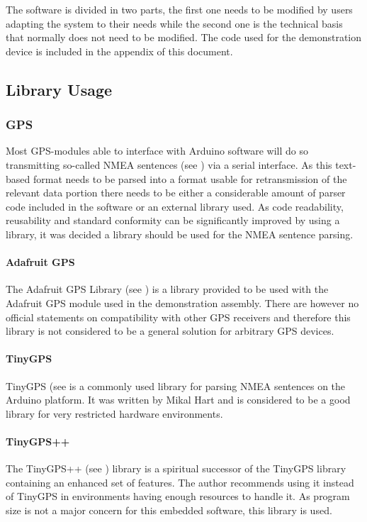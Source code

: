 The software is divided in two parts, the first one needs to be modified by users adapting the system to their needs while the second one is the technical basis that normally does not need to be modified. The code used for the demonstration device is included in the appendix of this document.

\subsection{Library Usage}
\subsubsection{GPS}
Most GPS-modules able to interface with Arduino software will do so transmitting so-called NMEA sentences (see \cite{NMEASentences}) via a serial interface. As this text-based format needs to be parsed into a format usable for retransmission of the relevant data portion there needs to be either a considerable amount of parser code included in the software or an external library used. As code readability, reusability and standard conformity can be significantly improved by using a library, it was decided a library should be used for the NMEA sentence parsing.

\paragraph{Adafruit GPS}
The Adafruit GPS Library (see \cite{AdaUltGPS}) is a library provided to be used with the Adafruit GPS module used in the demonstration assembly. There are however no official statements on compatibility with other GPS receivers and therefore this library is not considered to be a general solution for arbitrary GPS devices. 

\paragraph{TinyGPS}
TinyGPS (see \cite{TinyGPS} is a commonly used library for parsing NMEA sentences on the Arduino platform. It was written by Mikal Hart and is considered to be a good library for very restricted hardware environments.

\paragraph{TinyGPS++}
The TinyGPS++ (see \cite{TinyGpsPlus}) library is a spiritual successor of the TinyGPS library containing an enhanced set of features. The author recommends using it instead of TinyGPS in environments having enough resources to handle it. As program size is not a major concern for this embedded software, this library is used.

